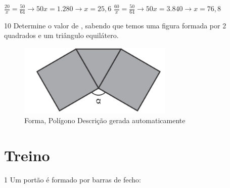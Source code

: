 \begin{escolha}
\begin{escolha}
\begin{escolha}
\begin{escolha}
{\begin{boxmedio}
\begin{boxpeq}
\begin{q°}
\begin{boxmedio}
\begin{boxpeq}
\begin{boxpeq}
\begin{boxmedio}
\begin{boxmedio}
\begin{boxmedio}
{$\frac{20}{x} = \frac{50}{64} \rightarrow 50x = 1.280 \rightarrow x = 25,6$
$\frac{60}{x} = \frac{50}{64} \rightarrow 50x = 3.840 \rightarrow x = 76,8$}

\num{10} Determine o valor de \alpha, sabendo que temos uma figura formada por 2
quadrados e um triângulo equilátero.

\begin{figure}
\centering
\includegraphics[width=2.90025in,height=1.35012in]{./_SAEB_9_MAT/media/image190.png}
\caption{Forma, Polígono Descrição gerada automaticamente}
\end{figure}



\section{Treino}

\num{1} Um portão é formado por barras de fecho:


\end{boxmedio}
\end{boxmedio}
\end{boxmedio}
\end{boxpeq}
\end{boxpeq}
\end{boxmedio}
\end{q°}
\end{boxpeq}
\end{boxmedio}}
\end{escolha}
\end{escolha}
\end{escolha}
\end{escolha}
